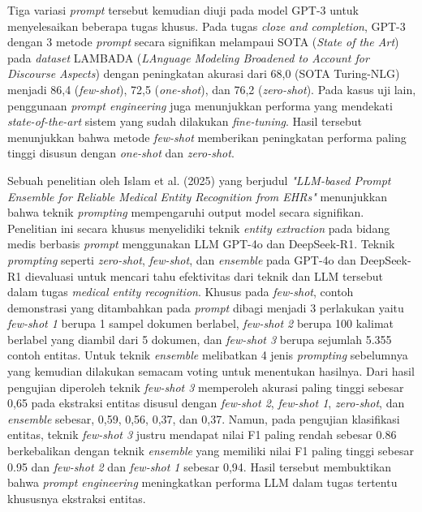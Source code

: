 Tiga variasi \textit{prompt} tersebut kemudian diuji pada model GPT-3 untuk menyelesaikan beberapa tugas khusus.
Pada tugas \textit{cloze and completion}, GPT-3 dengan 3 metode \textit{prompt} secara signifikan melampaui SOTA (\textit{State of the Art}) pada \textit{dataset}
LAMBADA (\textit{LAnguage Modeling Broadened to Account for Discourse Aspects}) dengan peningkatan akurasi dari 68,0 (SOTA Turing-NLG) menjadi 86,4 (\textit{few-shot}), 72,5 (\textit{one-shot}), dan 76,2 (\textit{zero-shot}).
Pada kasus uji lain, penggunaan \textit{prompt engineering} juga menunjukkan performa yang mendekati \textit{state-of-the-art} sistem yang sudah dilakukan \textit{fine-tuning}.
Hasil tersebut menunjukkan bahwa metode \textit{few-shot} memberikan peningkatan performa paling tinggi disusun dengan \textit{one-shot} dan \textit{zero-shot}.

Sebuah penelitian oleh Islam et al. (2025) yang berjudul \textit{"LLM-based Prompt Ensemble for Reliable Medical Entity Recognition from EHRs"} menunjukkan bahwa teknik \textit{prompting} mempengaruhi output model secara signifikan.
Penelitian ini secara khusus menyelidiki teknik \textit{entity extraction} pada bidang medis berbasis \textit{prompt} menggunakan LLM GPT-4o dan DeepSeek-R1.
Teknik \textit{prompting} seperti \textit{zero-shot}, \textit{few-shot}, dan \textit{ensemble} pada GPT-4o dan DeepSeek-R1 dievaluasi untuk mencari tahu efektivitas dari teknik dan LLM tersebut dalam tugas \textit{medical entity recognition}.
Khusus pada \textit{few-shot}, contoh demonstrasi yang ditambahkan pada \textit{prompt} dibagi menjadi 3 perlakukan yaitu \textit{few-shot 1} berupa 1 sampel dokumen berlabel, \textit{few-shot 2} berupa 100 kalimat berlabel yang diambil dari 5 dokumen, dan \textit{few-shot 3} berupa sejumlah 5.355 contoh entitas.
Untuk teknik \textit{ensemble} melibatkan 4 jenis \textit{prompting} sebelumnya yang kemudian dilakukan semacam voting untuk menentukan hasilnya.
Dari hasil pengujian diperoleh teknik \textit{few-shot 3} memperoleh akurasi paling tinggi sebesar 0,65 pada ekstraksi entitas disusul dengan \textit{few-shot 2}, \textit{few-shot 1}, \textit{zero-shot}, dan \textit{ensemble} sebesar, 0,59, 0,56, 0,37, dan 0,37.
Namun, pada pengujian klasifikasi entitas, teknik \textit{few-shot 3} justru mendapat nilai F1 paling rendah sebesar 0.86 berkebalikan dengan teknik \textit{ensemble} yang memiliki nilai F1 paling tinggi sebesar 0.95 dan \textit{few-shot 2} dan \textit{few-shot 1} sebesar 0,94.
Hasil tersebut membuktikan bahwa \textit{prompt engineering} meningkatkan performa LLM dalam tugas tertentu khususnya ekstraksi entitas.

